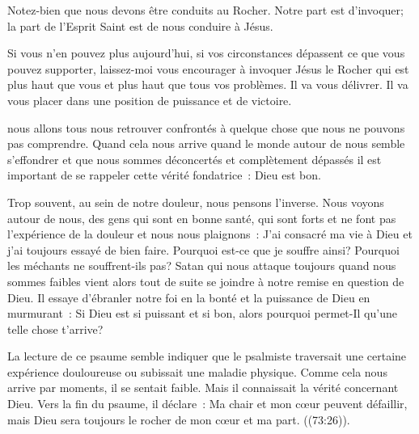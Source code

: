 Notez-bien que nous devons être conduits au Rocher.
 Notre part est d'invoquer; la part de l'Esprit Saint 
 est de nous conduire à Jésus.

Si vous n'en pouvez plus aujourd'hui, si vos circonstances dépassent
 ce que vous pouvez supporter, laissez-moi vous encourager à invoquer Jésus
 \ocadr le Rocher qui est plus haut que vous et plus haut
 que tous vos problèmes.
 Il va vous délivrer. Il va vous placer dans une position de puissance
 et de victoire. 

\dvrule






 nous allons tous nous retrouver confrontés
 à quelque chose que nous ne pouvons pas comprendre.
 Quand cela nous arrive \ocadr quand le monde autour de nous semble s'effondrer
 et que nous sommes déconcertés et complètement dépassés \fcadr{}
 il est important de se rappeler cette vérité fondatrice~: Dieu est bon.

Trop souvent, au sein de notre douleur, nous pensons l'inverse.
 Nous voyons autour de nous, des gens qui sont en bonne santé,
 qui sont forts et ne font pas l'expérience de la douleur
 et nous nous plaignons~:
 \og J'ai consacré ma vie à Dieu et j'ai toujours essayé de bien faire.
 Pourquoi est-ce que je souffre ainsi?
 Pourquoi les méchants ne souffrent-ils pas? \fg{}
 Satan \ocadr qui nous attaque toujours quand nous sommes faibles \fcadr{}
 vient alors tout de suite se joindre à notre remise en question de Dieu.
 Il essaye d'ébranler notre foi en la bonté et la puissance de Dieu
 en murmurant~:
 \og Si Dieu est si puissant et si bon, alors pourquoi permet-Il
 qu'une telle chose t'arrive? \fg{}


La lecture de ce psaume semble indiquer que le psalmiste traversait
 une certaine expérience douloureuse ou subissait une maladie physique.
 Comme cela nous arrive par moments, il se sentait faible.
 Mais il connaissait la vérité concernant Dieu.
 Vers la fin du psaume, il déclare~:
 \og Ma chair et mon cœur peuvent défaillir,
 mais Dieu sera toujours le rocher de mon cœur et ma part. \fg{}
 ((73:26)).

